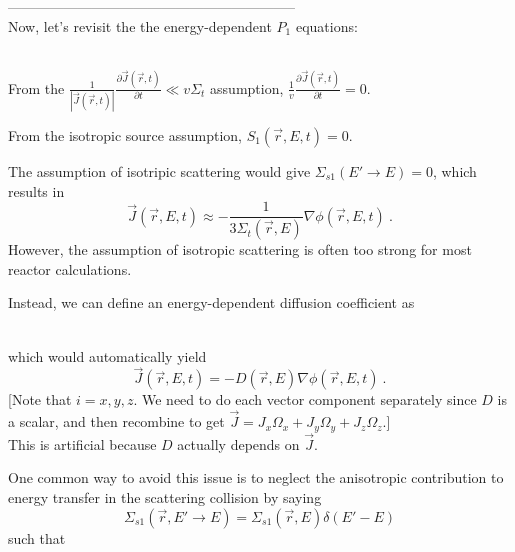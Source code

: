 \documentclass[12pt]{article}
\newif\ifeqns
\newcommand{\rvec}{\ensuremath{\vec{r}}}
\begin{document}
--------------------------------------------------------------\\
Now, let's revisit the the energy-dependent $P_1$ equations:
%
\ifeqns
\begin{align*}
\frac{1}{v}\frac{\partial\phi(\rvec,E,t)}{\partial t} = &S(\rvec,E,t) + 
\int^{\infty}_0dE'\:\Sigma_s(\rvec, E'\rightarrow E)\phi(\rvec,E',t) - 
\Sigma_t(\rvec,E)\phi(\rvec,E,t) \\ &- \nabla\cdot\vec{J}(\rvec,E,t)\\
%
\frac{1}{v}\frac{\partial \vec{J}(\rvec,E,t)}{\partial t} = &S_1(\rvec,E,t) + 
\int^{\infty}_0dE'\:\bar{\mu_0}\Sigma_s(\rvec,E'\rightarrow E)\vec{J}(\rvec,E',t) - 
\Sigma_t(\rvec,E)\vec{J}(\rvec,E,t) \\&- \frac{1}{3}\nabla\phi(\rvec,E,t)
\end{align*}
\else
\vspace*{7em}\\
\fi

From the $\frac{1}{|\vec{J}(\rvec,t)|}\frac{\partial\vec{J}(\rvec,t)}{\partial t}\ll v\Sigma_t$ 
assumption, $\frac{1}{v}\frac{\partial\vec{J}(\rvec,t)}{\partial t} = 0$.

From the isotropic source assumption, $S_1(\rvec,E,t) = 0$.

The assumption of isotripic scattering would give $\Sigma_{s1}(E' \rightarrow E)=0$, which results in
\[\vec{J}(\vec{r}, E, t) \approx - \frac{1}{3 \Sigma_t(\vec{r}, E)}\nabla \phi(\vec{r}, E, t)\:. \]
However, the assumption of isotropic scattering is often too strong for most reactor calculations.

Instead, we can define an energy-dependent diffusion coefficient as
\ifeqns
\[D(\vec{r}, E) = \frac{1}{3} \biggl[ \Sigma_t(\vec{r}, E) - \frac{\int_0^{\infty} dE' \: \Sigma_{s1}(\vec{r},E' \rightarrow E)J_i(\vec{r}, E', t)}{J_i(\vec{r}, E', t)}\biggr]^{-1}\:,\]
\else
\vspace*{3em}\\
\fi
which would automatically yield
\[\vec{J}(\vec{r}, E, t) = -D(\vec{r},E)\nabla \phi(\vec{r}, E, t)\:.\]
[Note that $i = x,y,z$. We need to do each vector component separately since $D$ is a scalar, and then recombine to get $\vec{J} = J_x \Omega_x + J_y \Omega_y + J_z \Omega_z$.]\\
This is artificial because $D$ actually depends on $\vec{J}$.

One common way to avoid this issue is to neglect the anisotropic contribution to energy transfer in the scattering collision by saying
\[\Sigma_{s1}(\vec{r},E' \rightarrow E) = \Sigma_{s1}(\vec{r},E) \delta(E' - E)\]
such that
\ifeqns
\[\int_0^{\infty} dE' \: \Sigma_{s1}(\vec{r},E' \rightarrow E)J_i(\vec{r}, E', t) = \bar{\mu_0} \Sigma_s(\vec{r},E) J_i(\vec{r}, E, t)\:.\]
And all of that gives
\[D(\vec{r}, E) = \frac{1}{3} \bigl[\Sigma_t(\vec{r}, E) - \bar{\mu_0} \Sigma_s(\vec{r}, E) \bigr]^{-1}\:.\]
\else
\vspace*{7em}\\
\fi
\end{document}
